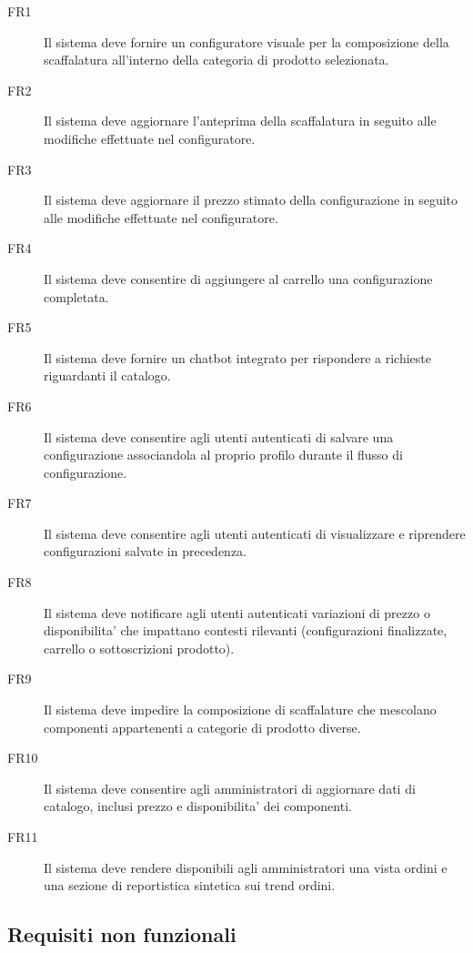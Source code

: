 \begin{description}
	\item[FR1] Il sistema deve fornire un configuratore visuale per la composizione della scaffalatura all'interno della categoria di prodotto selezionata.
	\item[FR2] Il sistema deve aggiornare l'anteprima della scaffalatura in seguito alle modifiche effettuate nel configuratore.
	\item[FR3] Il sistema deve aggiornare il prezzo stimato della configurazione in seguito alle modifiche effettuate nel configuratore.
	\item[FR4] Il sistema deve consentire di aggiungere al carrello una configurazione completata.
	\item[FR5] Il sistema deve fornire un chatbot integrato per rispondere a richieste riguardanti il catalogo.
	\item[FR6] Il sistema deve consentire agli utenti autenticati di salvare una configurazione associandola al proprio profilo durante il flusso di configurazione.
	\item[FR7] Il sistema deve consentire agli utenti autenticati di visualizzare e riprendere configurazioni salvate in precedenza.
	\item[FR8] Il sistema deve notificare agli utenti autenticati variazioni di prezzo o disponibilita' che impattano contesti rilevanti (configurazioni finalizzate, carrello o sottoscrizioni prodotto).
	\item[FR9] Il sistema deve impedire la composizione di scaffalature che mescolano componenti appartenenti a categorie di prodotto diverse.
	\item[FR10] Il sistema deve consentire agli amministratori di aggiornare dati di catalogo, inclusi prezzo e disponibilita' dei componenti.
	\item[FR11] Il sistema deve rendere disponibili agli amministratori una vista ordini e una sezione di reportistica sintetica sui trend ordini.
\end{description}

\subsection{Requisiti non funzionali}

